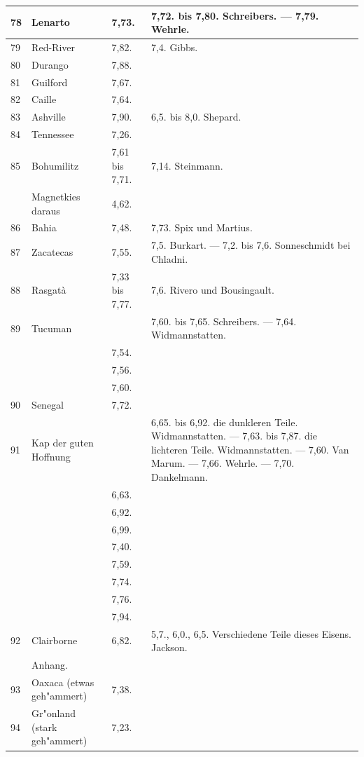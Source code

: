 \documentclass[a4paper, 11pt, oneside, polutonikogreek, german]{article}
\begin{document}
\begin{center}
\begin{longtable}{|p{7mm}|p{32mm}|p{30mm}|p{30mm}|}
        78 & Lenarto & 7,73. & 7,72. bis 7,80. Schreibers. --- 7,79. Wehrle. \\ \hline
        79 & Red-River & 7,82. & 7,4. Gibbs. \\ \hline
        80 & Durango & 7,88. & ~ \\ \hline
        81 & Guilford & 7,67. &  ~ \\ \hline
        82 & Caille & 7,64. & ~  \\ \hline
        83 & Ashville & 7,90. & 6,5. bis 8,0. Shepard. \\ \hline
        84 & Tennessee & 7,26. & ~  \\ \hline
        85 & Bohumilitz & 7,61 bis 7,71. & 7,14. Steinmann. \\ \hline
          & Magnetkies daraus & 4,62. & ~  \\ \hline
        86 & Bahia & 7,48. & 7,73. Spix und Martius. \\ \hline
        87 & Zacatecas & 7,55. & 7,5. Burkart. --- 7,2. bis 7,6. Sonneschmidt bei Chladni. \\ \hline
        88 & Rasgatà & 7,33 bis 7,77. & 7,6. Rivero und Bousingault. \\ \hline
        89 & Tucuman &   & 7,60. bis 7,65. Schreibers. --- 7,64. Widmannstatten. \\ \hline
         ~ &  ~ & 7,54. & ~  \\ \hline
         ~ & ~  & 7,56. & ~  \\ \hline
         ~ & ~  & 7,60. & ~  \\ \hline
        90 & Senegal & 7,72. &   \\ \hline
        91 & Kap der guten Hoffnung & ~ & 6,65. bis 6,92. die dunkleren Teile. Widmannstatten. --- 7,63. bis 7,87. die lichteren Teile. Widmannstatten. --- 7,60. Van Marum. --- 7,66. Wehrle. --- 7,70. Dankelmann. \\ \hline
         ~ &  ~ & 6,63. &  ~ \\ \hline
         ~~ & ~  & 6,92. & ~  \\ \hline
         ~ & ~  & 6,99. & ~  \\ \hline
         ~ & ~  & 7,40. & ~  \\ \hline
         ~ & ~  & 7,59. & ~  \\ \hline
        ~  & ~  & 7,74. & ~  \\ \hline
         ~ & ~  & 7,76. & ~  \\ \hline
       ~   & ~  & 7,94. & ~  \\ \hline
        92 & Clairborne & 6,82. & 5,7., 6,0., 6,5. Verschiedene Teile dieses Eisens. Jackson. \\ \hline
         ~ & Anhang. &  ~ &  ~ \\ \hline
        93 & Oaxaca (etwas geh"ammert) & 7,38. &   \\ \hline
        94 & Gr"onland (stark geh"ammert) & 7,23. & \\ \hline
    \end{longtable}
\end{center}
\clearpage
\end{document}
